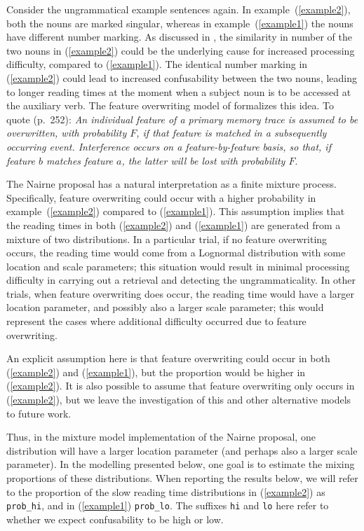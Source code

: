 \documentclass{cambridge7A}\usepackage[]{graphicx}\usepackage[]{color}
\begin{document}
Consider the ungrammatical example sentences again. In example~(\ref{example2}),
both the nouns are marked singular, whereas in example~(\ref{example1}) the nouns have different number marking. 
As discussed in \cite{VillataFranck},
the similarity in number of the two nouns in (\ref{example2}) could be the underlying cause for increased processing difficulty, compared to (\ref{example1}).
The identical number marking in (\ref{example2}) could lead to increased confusability between the two nouns, leading to longer reading times at the moment when a subject noun is to be accessed at the auxiliary verb. 
The feature overwriting model of \cite{Nairne1990} formalizes this idea. To quote (p.\ 252):
\textit{An individual feature of a primary memory trace is assumed to be overwritten, with probability $F$, if that feature is matched in a subsequently occurring event. Interference occurs on a feature-by-feature basis, so that, if feature $b$ matches feature $a$, the latter will be lost with probability $F$}.

The Nairne proposal has a natural interpretation as a finite mixture process. Specifically, feature overwriting could occur with a higher probability in example~(\ref{example2}) compared to (\ref{example1}). This assumption implies that the reading times in both (\ref{example2}) and (\ref{example1}) are generated from a mixture of two distributions. 
In a particular trial, if no feature overwriting occurs, the reading time would come from a Lognormal distribution with some location and scale parameters; this situation would result in 
minimal processing difficulty in  carrying out a retrieval and detecting the ungrammaticality. In other trials,
when feature overwriting does occur, 
the reading time would have a larger location parameter, and possibly also a larger scale parameter; this would represent the cases where additional difficulty occurred due to feature overwriting. 

An explicit assumption here is that feature overwriting could occur in both (\ref{example2}) and (\ref{example1}), but the proportion would be higher in (\ref{example2}). It is also possible to assume that feature overwriting only occurs in 
(\ref{example2}), but we leave the investigation of this and other alternative models to future work. 

Thus, in the mixture model implementation of the Nairne proposal, one distribution will have a larger location parameter (and perhaps also a larger scale parameter).
In the modelling presented below, one goal is to estimate the mixing proportions of these distributions.
When reporting the results below, we will refer to the proportion of the slow reading time distributions in (\ref{example2}) as \texttt{prob\_hi}, and in (\ref{example1}) \texttt{prob\_lo}. The suffixes \texttt{hi} and \texttt{lo} here refer to whether we expect confusability to be high or low.
\end{document}
